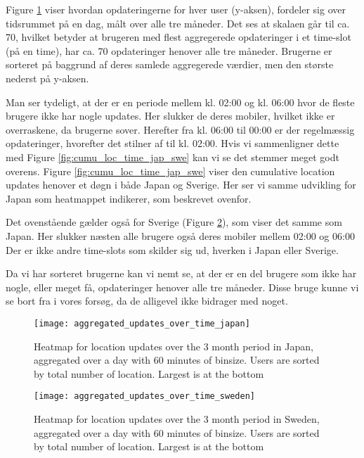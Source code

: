 Figure \ref{fig:agg_heatmap_jap} viser hvordan opdateringerne for hver user (y-aksen), fordeler sig over tidsrummet på en dag, målt over alle tre måneder. Det ses at skalaen går til ca. 70, hvilket betyder at brugeren med flest aggregerede opdateringer i et time-slot (på en time), har ca. 70 opdateringer henover alle tre måneder. Brugerne er sorteret på baggrund af deres samlede aggregerede værdier, men den største nederst på y-aksen. 

Man ser tydeligt, at der er en periode mellem kl. 02:00 og kl. 06:00 hvor de fleste brugere ikke har nogle updates. Her slukker de deres mobiler, hvilket ikke er overraskene, da brugerne sover. Herefter fra kl. 06:00 til 00:00 er der regelmæssig opdateringer, hvorefter det stilner af til kl. 02:00. Hvis vi sammenligner dette med Figure \ref{fig:cumu_loc_time_jap_swe} kan vi se det stemmer meget godt overens. Figure \ref{fig:cumu_loc_time_jap_swe} viser den cumulative location updates henover et døgn i både Japan og Sverige. Her ser vi samme udvikling for Japan som heatmappet indikerer, som beskrevet ovenfor. 

Det ovenstående gælder også for Sverige (Figure \ref{fig:agg_heatmap_swe}), som viser det samme som Japan. Her slukker næsten alle brugere også deres mobiler mellem 02:00 og 06:00
Der er ikke andre time-slots som skilder sig ud, hverken i Japan eller Sverige. 

Da vi har sorteret brugerne kan vi nemt se, at der er en del brugere som ikke har nogle, eller meget få, opdateringer henover alle tre måneder. Disse bruge kunne vi se bort fra i vores forsøg, da de alligevel ikke bidrager med noget. 

\begin{figure}[H]
    \hspace*{-0.8cm}
    \centering
    \texttt{[image: aggregated\_updates\_over\_time\_japan]}
    \caption{Heatmap for location updates over the 3 month period in Japan, aggregated over a day with 60 minutes of binsize. Users are sorted by total number of location. Largest is at the bottom}
    \label{fig:agg_heatmap_jap}
\end{figure}
\begin{figure}[H]
    \hspace*{-0.8cm}
    \centering
    \texttt{[image: aggregated\_updates\_over\_time\_sweden]}
    \caption{Heatmap for location updates over the 3 month period in Sweden, aggregated over a day with 60 minutes of binsize. Users are sorted by total number of location. Largest is at the bottom}
    \label{fig:agg_heatmap_swe}
\end{figure}

